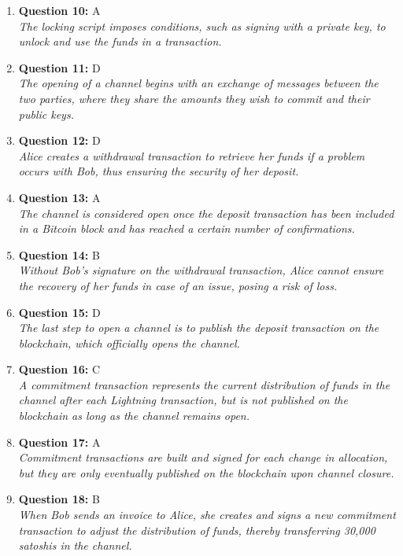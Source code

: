 \documentclass[12pt,a4paper]{article}
\begin{document}
\begin{enumerate}
\item \textbf{Question 10:} A
\\ \textit{The locking script imposes conditions, such as signing with a private key, to unlock and use the funds in a transaction.}

\item \textbf{Question 11:} D
\\ \textit{The opening of a channel begins with an exchange of messages between the two parties, where they share the amounts they wish to commit and their public keys.}

\item \textbf{Question 12:} D
\\ \textit{Alice creates a withdrawal transaction to retrieve her funds if a problem occurs with Bob, thus ensuring the security of her deposit.}

\item \textbf{Question 13:} A
\\ \textit{The channel is considered open once the deposit transaction has been included in a Bitcoin block and has reached a certain number of confirmations.}

\item \textbf{Question 14:} B
\\ \textit{Without Bob's signature on the withdrawal transaction, Alice cannot ensure the recovery of her funds in case of an issue, posing a risk of loss.}

\item \textbf{Question 15:} D
\\ \textit{The last step to open a channel is to publish the deposit transaction on the blockchain, which officially opens the channel.}

\item \textbf{Question 16:} C
\\ \textit{A commitment transaction represents the current distribution of funds in the channel after each Lightning transaction, but is not published on the blockchain as long as the channel remains open.}

\item \textbf{Question 17:} A
\\ \textit{Commitment transactions are built and signed for each change in allocation, but they are only eventually published on the blockchain upon channel closure.}

\item \textbf{Question 18:} B
\\ \textit{When Bob sends an invoice to Alice, she creates and signs a new commitment transaction to adjust the distribution of funds, thereby transferring 30,000 satoshis in the channel.}


\end{enumerate}
\end{document}
